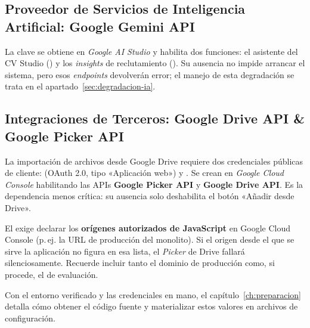 \subsection[Inteligencia Artificial: Google Gemini]{Proveedor de Servicios de Inteligencia Artificial: Google Gemini API}%
\label{subsec:gemini}

La clave  se obtiene en \textit{Google AI Studio} y habilita
dos funciones: el asistente del CV Studio () y los
\textit{insights} de reclutamiento (). Su ausencia no
impide arrancar el sistema, pero esos \textit{endpoints} devolverán error; el manejo de
esta degradación se trata en el apartado~\ref{sec:degradacion-ia}.\par

\subsection[Integraciones: Google Drive y Picker]{Integraciones de Terceros: Google Drive API \& Google Picker API}%
\label{subsec:drive}

La importación de archivos desde Google Drive requiere dos credenciales públicas de
cliente:  (OAuth 2.0, tipo «Aplicación web») y
. Se crean en \textit{Google Cloud Console} habilitando
las APIs \textbf{Google Picker API} y \textbf{Google Drive API}. Es la dependencia menos
crítica: su ausencia solo deshabilita el botón «Añadir desde Drive».\par

\begin{AvisoPrecaucion}
El  exige declarar los \textbf{orígenes autorizados de
JavaScript} en Google Cloud Console (p.\,ej. la URL de producción del monolito). Si el
origen desde el que se sirve la aplicación no figura en esa lista, el \textit{Picker} de
Drive fallará silenciosamente. Recuerde incluir tanto el dominio de producción como, si
procede, el de evaluación.
\end{AvisoPrecaucion}

\par\vspace{0.2cm}
Con el entorno verificado y las credenciales en mano, el capítulo~\ref{ch:preparacion}
detalla cómo obtener el código fuente y materializar estos valores en archivos de
configuración.\par
